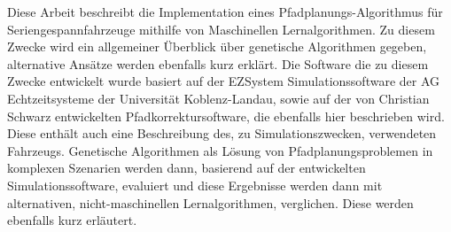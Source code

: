 \abstractDE 

Diese Arbeit beschreibt die Implementation eines Pfadplanungs-Algorithmus für Seriengespannfahrzeuge mithilfe von Maschinellen Lernalgorithmen. Zu diesem Zwecke wird ein allgemeiner Überblick über genetische Algorithmen gegeben, alternative Ansätze werden ebenfalls kurz erklärt. Die Software die zu diesem Zwecke entwickelt wurde basiert auf der EZSystem Simulationssoftware der AG Echtzeitsysteme der Universität Koblenz-Landau, sowie auf der von Christian Schwarz entwickelten Pfadkorrektursoftware, die ebenfalls hier beschrieben wird. Diese enthält auch eine Beschreibung des, zu Simulationszwecken, verwendeten Fahrzeugs. Genetische Algorithmen als Lösung von Pfadplanungsproblemen in komplexen Szenarien werden dann, basierend auf der entwickelten Simulationssoftware, evaluiert und diese Ergebnisse werden dann mit alternativen, nicht-maschinellen Lernalgorithmen, verglichen. Diese werden ebenfalls kurz erläutert.

